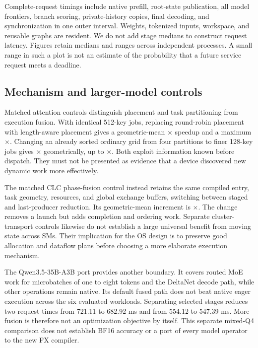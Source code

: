 Complete-request timings include native prefill, root-state publication,
all model frontiers, branch scoring, private-history copies, final decoding,
and synchronization in one outer interval. Weights, tokenized inputs,
workspace, and reusable graphs are resident. We do not add stage medians
to construct request latency. Figures retain medians and ranges across
independent processes. A small range in such a plot is not an estimate of
the probability that a future service request meets a deadline.



\subsection{Mechanism and larger-model controls}
Matched attention controls distinguish placement and task partitioning from
execution fusion. With identical 512-key jobs, replacing round-robin placement
with length-aware placement gives a geometric-mean
$\times$ speedup and a maximum
$\times$. Changing an already sorted ordinary grid from
four partitions to finer 128-key jobs gives $\times$
geometrically, up to $\times$. Both exploit information
known before dispatch. They must not be presented as evidence that a device
discovered new dynamic work more effectively.

The matched CLC phase-fusion control instead retains the same compiled entry,
task geometry, resources, and global exchange buffers, switching between
staged and last-producer reduction. Its geometric-mean increment is
$\times$. The change removes a launch but adds completion
and ordering work. Separate cluster-transport controls likewise do not
establish a large universal benefit from moving state across SMs. Their
implication for the OS design is to preserve good allocation and dataflow
plans before choosing a more elaborate execution mechanism.

The Qwen3.5-35B-A3B port provides another boundary. It covers routed MoE
work for microbatches of one to eight tokens and the DeltaNet decode path,
while other operations remain native. Its default fused path does not beat
native eager execution across the six evaluated workloads. Separating
selected stages reduces two request times from 721.11 to 682.92 ms and
from 554.12 to 547.39 ms. More fusion is therefore not an optimization
objective by itself. This separate mixed-Q4 comparison does not establish
BF16 accuracy or a port of every model operator to the new FX compiler.

